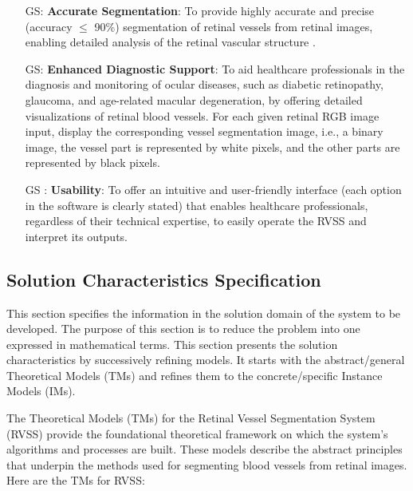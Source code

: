 \documentclass[12pt]{article}
\newcounter{goalnum} %
\begin{document}
\begin{itemize}

\item[GS\refstepcounter{goalnum}\thegoalnum \label{G_meaningfulLabel}:] \textbf{Accurate Segmentation}: To provide highly accurate and precise (accuracy $\leq$ 90$\%$) segmentation of retinal vessels from retinal images, enabling detailed analysis of the retinal vascular structure . 


\item[GS\refstepcounter{goalnum}\thegoalnum \label{G_meaningfulLabel}:] \textbf{Enhanced Diagnostic Support}: To aid healthcare professionals in the diagnosis and monitoring of ocular diseases, such as diabetic retinopathy, glaucoma, and age-related macular degeneration, by offering detailed visualizations of retinal blood vessels. For each given retinal RGB image input, display the corresponding vessel segmentation image, i.e., a binary image, the vessel part is represented by white pixels, and the other parts are represented by black pixels.

\item[GS\refstepcounter{goalnum}\thegoalnum 
\label{G_meaningfulLabel}:] \textbf{Usability}: To offer an intuitive and user-friendly interface (each option in the software is clearly stated) that enables healthcare professionals, regardless of their technical expertise, to easily operate the RVSS and interpret its outputs. 

\end{itemize}

\subsection{Solution Characteristics Specification}
This section specifies the information in the solution domain of the system to be developed. The purpose of this section is to reduce the problem into one expressed in mathematical terms. This section presents the solution characteristics by successively refining models. It starts with the abstract/general Theoretical Models (TMs) and refines them to the concrete/specific Instance Models (IMs).

The Theoretical Models (TMs) for the Retinal Vessel Segmentation System (RVSS) provide the foundational theoretical framework on which the system's algorithms and processes are built. These models describe the abstract principles that underpin the methods used for segmenting blood vessels from retinal images. Here are the TMs for RVSS:
\end{document}
